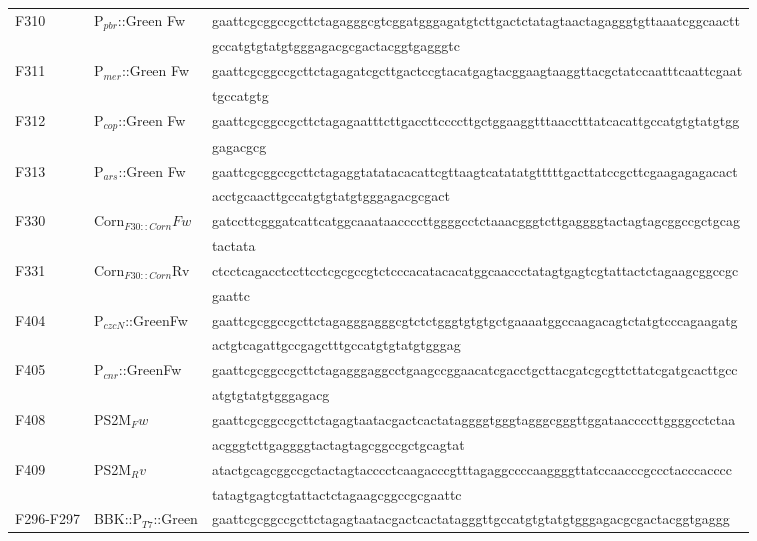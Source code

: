 \begin{table}[h]
{\begin{tabular*}{\columnwidth}{@{}lll@{}}
F310 & P$_{pbr}$::Green Fw &  \MakeLowercase{GAATTCGCGGCCGCTTCTAGAGGGCGTCGGATGGGAGATGTCTTGACTCTATAGTAACTAGAGGGTGTTAAATCGGCAACTT}
\\
&  &  \MakeLowercase{GCCATGTGTATGTGGGAGACGCGACTACGGTGAGGGTC}
\\
F311 & P$_{mer}$::Green Fw & \MakeLowercase{GAATTCGCGGCCGCTTCTAGAGATCGCTTGACTCCGTACATGAGTACGGAAGTAAGGTTACGCTATCCAATTTCAATTCGAAT}
\\
& & \MakeLowercase{TGCCATGTG}
\\
F312 & P$_{cop}$::Green Fw & \MakeLowercase{GAATTCGCGGCCGCTTCTAGAGAATTTCTTGACCTTCCCCTTGCTGGAAGGTTTAACCTTTATCACATTGCCATGTGTATGTGG}
\\
& & \MakeLowercase{GAGACGCG}
\\
F313 & P$_{ars}$::Green Fw & \MakeLowercase{GAATTCGCGGCCGCTTCTAGAGGTATATACACATTCGTTAAGTCATATATGTTTTTGACTTATCCGCTTCGAAGAGAGACACT}
\\
 &  & \MakeLowercase{ACCTGCAACTTGCCATGTGTATGTGGGAGACGCGACT}
\\
F330 & Corn$_{F30::Corn}Fw$ & \MakeLowercase{GATCCTTCGGGATCATTCATGGCAAATAACCCCTTGGGGCCTCTAAACGGGTCTTGAGGGGTACTAGTAGCGGCCGCTGCAG}
\\
& & \MakeLowercase{tactata}
\\
F331 & Corn$_{F30::Corn}$Rv & \MakeLowercase{CTCCTCAGACCTCCTTCCTCGCGCcgtctCCCACATACACATGGCAACCCTATAGTGAGTCGTATTACTCTAGaagcggccgc}
\\
& & \MakeLowercase{gaattc}
\\
F404 & 	P$_{czcN}$::GreenFw & \MakeLowercase{GAATTCGCGGCCGCTTCTAGAGggagggcgtctctgggtgtgtgctgaaaatggccaagacagtctatgtcccagaagatg}
\\
&  &  \MakeLowercase{actgtcagattgccgagctTTGCCATGTGTATGTGGGAG}
\\
F405 & P$_{cnr}$::GreenFw & \MakeLowercase{GAATTCGCGGCCGCTTCTAGAGggaggcctgaagccggaacatcgacctgcttacgatcgcgttcttatcgatgcacTTGCC}
\\
& & \MakeLowercase{ATGTGTATGTGGGAGACG}
\\
F408 & PS2M$_Fw$ & \MakeLowercase{gaattcgcggccgcttCTAGAGTAATACGACTCACTATAGGGGTGGGTAGGGCGGGTTGGATAACCCCTTGGGGCCTCTAA}
\\
&  &  \MakeLowercase{ACGGGTCTTGAGGGGtactagtagcggccgctgcagTAT}
\\
F409 & PS2M$_Rv$ & \MakeLowercase{ATActgcagcggccgctactagtaCCCCTCAAGACCCGTTTAGAGGCCCCAAGGGGTTATCCAACCCGCCCTACCCACCCC}
\\
& & \MakeLowercase{TATAGTGAGTCGTATTACTCTAGaagcggccgcgaattc}
\\
F296-F297 & BBK::P$_{T7}$::Green & \MakeLowercase{gaattcgcggccgcttCTAGAGTAATACGACTCACTATAGGGTTGCCATGTGTATGTGGGAGACGCGACTACGGTGAGGG}

\end{tabular*}}
\end{table}
